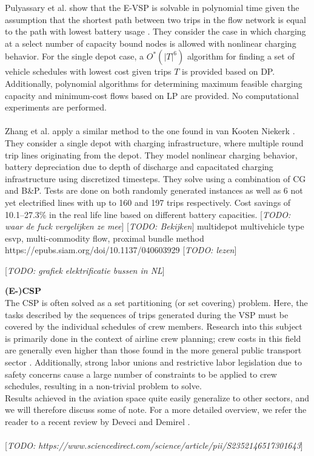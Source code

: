 \documentclass[ht]{article}
\newcommand{\todo}[1]{{\color{red}[\textit{TODO: #1}]}}
\begin{document}
Pulyassary et al. show that the E-VSP is solvable in polynomial time given the
assumption that the shortest path between two trips in the flow network is
equal to the path with lowest battery usage \cite{Pulyassary2024}. They
consider the case in which charging at a select number of capacity bound nodes
is allowed with nonlinear charging behavior. For the single depot case, a
$O^*(|T|^6)$ algorithm for finding a set of vehicle schedules with lowest cost
given trips $T$ is provided based on DP. Additionally, polynomial algorithms
for determining maximum feasible charging capacity and minimum-cost flows based
on LP are provided. No computational experiments are performed. \\\\

Zhang et al. apply a similar method to the one found in van Kooten Niekerk
\cite{Zhang2021}. They consider a single depot with charging infrastructure,
where multiple round trip lines originating from the depot. They model
nonlinear charging behavior, battery depreciation due to depth of discharge and
capacitated charging infrastructure using discretized timesteps. They solve
using a combination of CG and B\&P. Tests are done on both randomly generated
instances as well as 6 not yet electrified lines with up to 160 and 197 trips
respectively. Cost savings of 10.1–27.3\% in the real life line based on
different battery capacities. \todo{waar de fuck vergelijken ze mee}
\todo{Bekijken} multidepot multivehicle type esvp, multi-commodity flow,
proximal bundle method https://epubs.siam.org/doi/10.1137/040603929
\todo{lezen}\cite{Borndörfer2024}

\todo{grafiek elektrificatie bussen in NL}

\noindent \textbf{(E-)CSP}\\
The CSP is often solved as a set partitioning (or set covering) problem. Here, the tasks described by the sequences of trips generated during the VSP must be covered by the individual schedules of crew members. Research into this subject is primarily done in the context of airline crew planning; crew costs in this field are generally even higher than those found in the more general public transport sector \cite{Barnhart2003}. Additionally, strong labor unions and restrictive labor legislation due to safety concerns cause a large number of constraints to be applied to crew schedules, resulting in a non-trivial problem to solve. \\
Results achieved in the aviation space quite easily generalize to other sectors, and we will therefore discuss some of note. For a more detailed overview, we refer the reader to a recent review by Deveci and Demirel \cite{Deveci2018}. \\\\
\todo{https://www.sciencedirect.com/science/article/pii/S2352146517301643}
\end{document}
